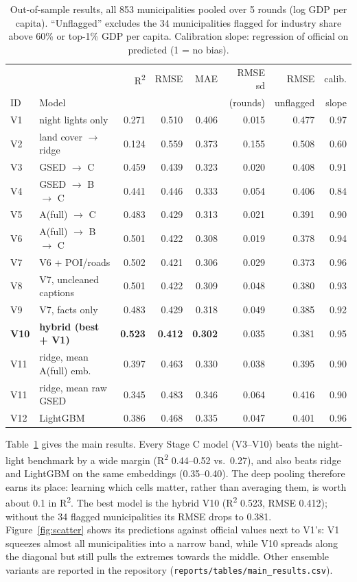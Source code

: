 \documentclass[11pt,a4paper]{article}
\newcommand{\R}{R\textsuperscript{2}}
\begin{document}
\begin{table}[!htbp]
\centering\small
\caption{Out-of-sample results, all 853 municipalities pooled over 5 rounds (log GDP per capita). ``Unflagged''
excludes the 34 municipalities flagged for industry share above 60\% or top-1\% GDP per capita. Calibration
slope: regression of official on predicted (1 = no bias).}
\label{tab:results}
\begin{tabular}{@{}llrrrrrr@{}}
\toprule
 & & \R & RMSE & MAE & RMSE sd & RMSE & calib. \\
ID & Model & & & & (rounds) & unflagged & slope \\
\midrule
V1 & night lights only & 0.271 & 0.510 & 0.406 & 0.015 & 0.477 & 0.97 \\
V2 & land cover $\to$ ridge & 0.124 & 0.559 & 0.373 & 0.155 & 0.508 & 0.60 \\
V3 & GSED $\to$ C & 0.459 & 0.439 & 0.323 & 0.020 & 0.408 & 0.91 \\
V4 & GSED $\to$ B $\to$ C & 0.441 & 0.446 & 0.333 & 0.054 & 0.406 & 0.84 \\
V5 & A(full) $\to$ C & 0.483 & 0.429 & 0.313 & 0.021 & 0.391 & 0.90 \\
V6 & A(full) $\to$ B $\to$ C & 0.501 & 0.422 & 0.308 & 0.019 & 0.378 & 0.94 \\
V7 & V6 + POI/roads & 0.502 & 0.421 & 0.306 & 0.029 & 0.373 & 0.96 \\
V8 & V7, uncleaned captions & 0.501 & 0.422 & 0.309 & 0.048 & 0.380 & 0.93 \\
V9 & V7, facts only & 0.483 & 0.429 & 0.318 & 0.049 & 0.385 & 0.92 \\
\textbf{V10} & \textbf{hybrid (best + V1)} & \textbf{0.523} & \textbf{0.412} & \textbf{0.302} & 0.035 & 0.381 & 0.95 \\
V11 & ridge, mean A(full) emb. & 0.397 & 0.463 & 0.330 & 0.038 & 0.395 & 0.90 \\
V11 & ridge, mean raw GSED & 0.345 & 0.483 & 0.346 & 0.064 & 0.416 & 0.90 \\
V12 & LightGBM & 0.386 & 0.468 & 0.335 & 0.047 & 0.401 & 0.96 \\
\bottomrule
\end{tabular}
\end{table}

Table~\ref{tab:results} gives the main results. Every Stage C model (V3--V10) beats the night-light benchmark by a
wide margin (\R{} 0.44--0.52 vs.\ 0.27), and also beats ridge and LightGBM on the same embeddings (0.35--0.40). The
deep pooling therefore earns its place: learning which cells matter, rather than averaging them, is worth about 0.1
in \R. The best model is the hybrid V10 (\R{} 0.523, RMSE 0.412); without the 34 flagged municipalities its RMSE
drops to 0.381. Figure~\ref{fig:scatter} shows its predictions against official values next to V1's: V1 squeezes
almost all municipalities into a narrow band, while V10 spreads along the diagonal but still pulls the extremes
towards the middle. Other ensemble variants are reported in the repository (\texttt{reports/tables/main\_results.csv}).
\end{document}
